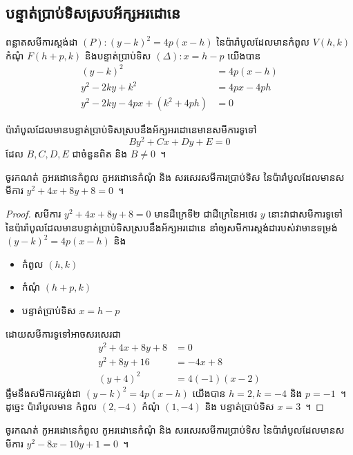 \subsection{បន្ទាត់ប្រាប់ទិសស្របអ័ក្សអរដោនេ}
ពន្លាតសមីការស្ដង់ដា $ (P):(y-k)^2=4p(x-h) $ នៃប៉ារ៉ាបូលដែលមានកំពូល $ V(h,k) $ កំណុំ $ F(h+p,k) $ និងបន្ទាត់ប្រាប់ទិស $ (\Delta):x=h-p $ យើងបាន
\begin{align*}
(y-k)^2 &=4p(x-h)\\
y^2-2ky+k^2 &= 4px-4ph\\
y^2-2ky-4px+(k^2+4ph) &=0
\end{align*}
%
\begin{generality}
	ប៉ារ៉ាបូលដែលមានបន្ទាត់ប្រាប់ទិសស្របនឹងអ័ក្សអរដោនេមានសមីការទូទៅ
	\begin{equation}
	By^2+Cx+Dy+E=0
	\end{equation}
	ដែល $ B,C,D,E $ ជាចំនួនពិត និង $ B\neq 0 $~។
\end{generality}
%
\begin{example}
	ចូរកណត់ កូអរដោនេ​កំពូល កូអរដោនេ​កំណុំ និង សរសេរសមីការប្រាប់ទិស នៃប៉ារ៉ាបូលដែលមានសមីការ $ y^2+4x+8y+8=0 $~។
\end{example}
%
\begin{proof}
	សមីការ $ y^2+4x+8y+8=0 $ មានដឺក្រេទី២ ជាដឺក្រេនៃអថេរ $ y $ នោះវាជាសមីការទូទៅនៃប៉ារ៉ាបូលដែលមានបន្ទាត់ប្រាប់ទិសស្របនឹងអ័ក្សអរដោនេ នាំឲ្យសមីការស្តង់ដារបស់វាមានទម្រង់ $ (y-k)^2=4p(x-h) $ និង
	\begin{itemize}
		\item កំពូល $ (h,k) $
		\item កំណុំ $ (h+p,k) $
		\item បន្ទាត់ប្រាប់ទិស $ x=h-p $
	\end{itemize}
	ដោយសមីការទូទៅអាចសរសេរជា
	\begin{align*}
	y^2+4x+8y+8 &=0\\
	y^2+8y+16 &=-4x+8\\
	(y+4)^2 &=4(-1)(x-2)
	\end{align*}
	ផ្ទឹមនឹងសមីការស្តង់ដា $ (y-k)^2=4p(x-h) $ យើងបាន $ h=2,k=-4 $ និង $ p=-1 $~។ ដូច្នេះ ប៉ារ៉ាបូលមាន​ កំពូល $ (2,-4) $ កំណុំ $ (1,-4) $ និង បន្ទាត់ប្រាប់ទិស $ x=3 $~។
\end{proof}
%
\begin{example}
	ចូរកណត់ កូអរដោនេ​កំពូល កូអរដោនេ​កំណុំ និង សរសេរសមីការប្រាប់ទិស នៃប៉ារ៉ាបូលដែលមានសមីការ $ y^2-8x-10y+1=0 $~។
\end{example}
%
